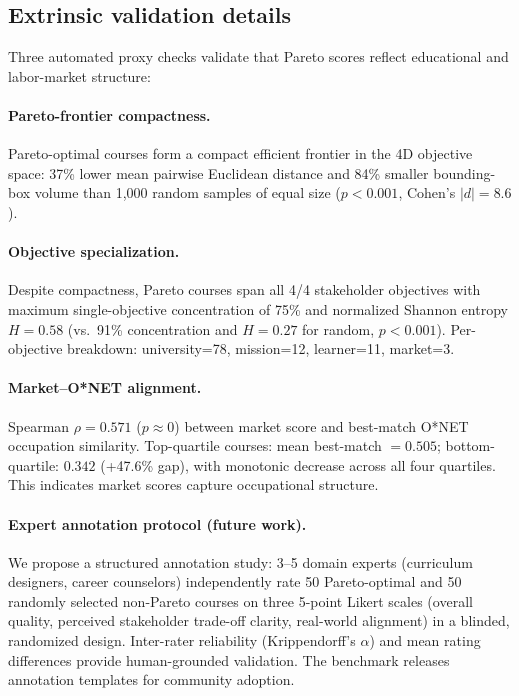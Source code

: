 \documentclass[sigconf,review]{acmart}
\begin{document}
\subsection{Extrinsic validation details}
Three automated proxy checks validate that Pareto scores reflect educational and labor-market structure:

\paragraph{Pareto-frontier compactness.} Pareto-optimal courses form a compact efficient frontier in the 4D objective space: 37\% lower mean pairwise Euclidean distance and 84\% smaller bounding-box volume than 1,000 random samples of equal size ($p < 0.001$, Cohen's $|d| = 8.6$).

\paragraph{Objective specialization.} Despite compactness, Pareto courses span all 4/4 stakeholder objectives with maximum single-objective concentration of 75\% and normalized Shannon entropy $H = 0.58$ (vs.\ 91\% concentration and $H = 0.27$ for random, $p < 0.001$). Per-objective breakdown: university=78, mission=12, learner=11, market=3.

\paragraph{Market--O*NET alignment.} Spearman $\rho = 0.571$ ($p \approx 0$) between market score and best-match O*NET occupation similarity. Top-quartile courses: mean best-match $= 0.505$; bottom-quartile: $0.342$ (+47.6\% gap), with monotonic decrease across all four quartiles. This indicates market scores capture occupational structure.

\paragraph{Expert annotation protocol (future work).} We propose a structured annotation study: 3--5 domain experts (curriculum designers, career counselors) independently rate 50 Pareto-optimal and 50 randomly selected non-Pareto courses on three 5-point Likert scales (overall quality, perceived stakeholder trade-off clarity, real-world alignment) in a blinded, randomized design. Inter-rater reliability (Krippendorff's $\alpha$) and mean rating differences provide human-grounded validation. The benchmark releases annotation templates for community adoption.
\end{document}
